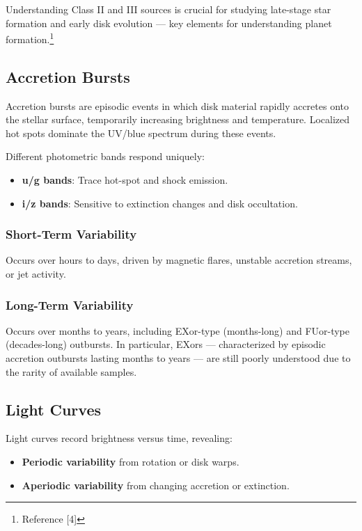 \documentclass{article}
\begin{document}
Understanding Class II and III sources is crucial for studying late-stage star formation and early disk evolution — key elements for understanding planet formation.\footnote{Reference [4]}

\subsection{Accretion Bursts}

Accretion bursts are episodic events in which disk material rapidly accretes onto the stellar surface, temporarily increasing brightness and temperature. Localized hot spots dominate the UV/blue spectrum during these events.

Different photometric bands respond uniquely:
\begin{itemize}
    \item \textbf{u/g bands}: Trace hot-spot and shock emission.
    \item \textbf{i/z bands}: Sensitive to extinction changes and disk occultation.
\end{itemize}

\subsubsection{Short-Term Variability}
Occurs over hours to days, driven by magnetic flares, unstable accretion streams, or jet activity.

\subsubsection{Long-Term Variability}
Occurs over months to years, including EXor-type (months-long) and FUor-type (decades-long) outbursts. In particular, EXors — characterized by episodic accretion outbursts lasting months to years — are still poorly understood due to the rarity of available samples.

\subsection{Light Curves}

Light curves record brightness versus time, revealing:
\begin{itemize}
    \item \textbf{Periodic variability} from rotation or disk warps.
    \item \textbf{Aperiodic variability} from changing accretion or extinction.
\end{itemize}
\end{document}
